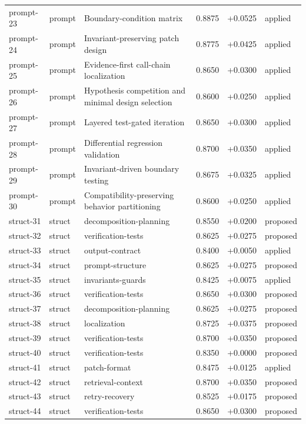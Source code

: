 \begin{center}
\begin{longtable}{llp{5.2cm}rrl}
prompt-23 & prompt & Boundary-condition matrix & 0.8875 & +0.0525 & applied \\
prompt-24 & prompt & Invariant-preserving patch design & 0.8775 & +0.0425 & applied \\
prompt-25 & prompt & Evidence-first call-chain localization & 0.8650 & +0.0300 & applied \\
prompt-26 & prompt & Hypothesis competition and minimal design selection & 0.8600 & +0.0250 & applied \\
prompt-27 & prompt & Layered test-gated iteration & 0.8650 & +0.0300 & applied \\
prompt-28 & prompt & Differential regression validation & 0.8700 & +0.0350 & applied \\
prompt-29 & prompt & Invariant-driven boundary testing & 0.8675 & +0.0325 & applied \\
prompt-30 & prompt & Compatibility-preserving behavior partitioning & 0.8600 & +0.0250 & applied \\
struct-31 & struct & decomposition-planning & 0.8550 & +0.0200 & proposed \\
struct-32 & struct & verification-tests & 0.8625 & +0.0275 & proposed \\
struct-33 & struct & output-contract & 0.8400 & +0.0050 & applied \\
struct-34 & struct & prompt-structure & 0.8625 & +0.0275 & proposed \\
struct-35 & struct & invariants-guards & 0.8425 & +0.0075 & applied \\
struct-36 & struct & verification-tests & 0.8650 & +0.0300 & proposed \\
struct-37 & struct & decomposition-planning & 0.8625 & +0.0275 & proposed \\
struct-38 & struct & localization & 0.8725 & +0.0375 & proposed \\
struct-39 & struct & verification-tests & 0.8700 & +0.0350 & proposed \\
struct-40 & struct & verification-tests & 0.8350 & +0.0000 & proposed \\
struct-41 & struct & patch-format & 0.8475 & +0.0125 & applied \\
struct-42 & struct & retrieval-context & 0.8700 & +0.0350 & proposed \\
struct-43 & struct & retry-recovery & 0.8525 & +0.0175 & proposed \\
struct-44 & struct & verification-tests & 0.8650 & +0.0300 & proposed \\

\end{longtable}
\end{center}
